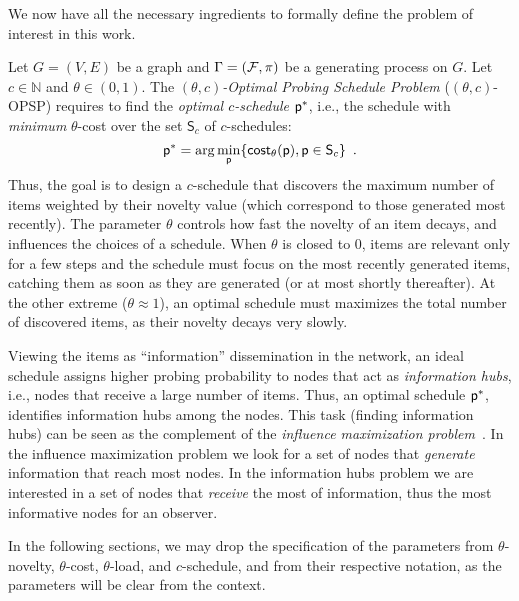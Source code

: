 We now have all the necessary ingredients to formally define the problem of
interest in this work.

 Let $G=(V,E)$ be a graph and $\Gamma=(\mathcal{F},\pi)$ be a
generating process on $G$. Let $c\in\mathbb{N}$ and
$\theta\in(0,1)$. The \emph{$(\theta,c)$-Optimal Probing Schedule Problem}
($(\theta,c)$-OPSP) requires to find the \emph{optimal $c$-schedule} $\mathsf{p}^*$,
i.e., the schedule with \emph{minimum} $\theta$-cost over the set $\mathsf{S}_c$
of $c$-schedules:
\[
	\mathsf{p}^*=\arg\min_{\mathsf{p}} \{\mathsf{cost}_\theta(\mathsf{p}), \mathsf{p}\in\mathsf{S}_c\}\enspace.
\]
Thus, the goal is to design a $c$-schedule that discovers the maximum number of items weighted by their
novelty value (which correspond to those generated most recently).
The parameter $\theta$ controls how fast the novelty of an item decays, and influences the choices of a schedule.
When $\theta$ is closed to $0$, items are relevant only for a few steps and the schedule
must focus on the most recently generated items, catching them as soon as they are generated (or at most shortly
thereafter). At the other extreme ($\theta\approx 1$), an optimal schedule
must maximizes the total number of discovered items, as their novelty decays very
slowly.

Viewing the items as ``information'' dissemination in the network,
an ideal schedule assigns higher probing probability  to nodes
that act as \emph{ information hubs}, i.e., nodes that receive a large number of
items. Thus, an optimal schedule $\mathsf{p}^*$, identifies
information hubs among the nodes. This task (finding information hubs) can be
seen as the complement of the \emph{influence maximization
problem}~\citep{Kempe2003,Kempe2005}. In the influence maximization problem we
look for a set of nodes that \emph{generate} information that reach most nodes.
In the information hubs problem we are interested in a set of nodes that
\emph{receive} the most of information, thus the most informative nodes for an
observer.

In the following sections, we may drop the specification of the parameters
from $\theta$-novelty, $\theta$-cost, $\theta$-load, and $c$-schedule, and
from their respective notation, as the parameters will be clear from the
context.

